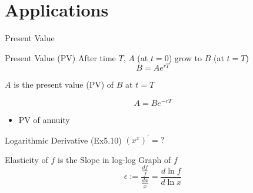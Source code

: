 \documentclass[final]{beamer}
\begin{document}
\section{Applications} %
\label{sec:applications}
\begin{frame}[t]{Present Value}
	\begin{block}{Present Value (PV)}
		After time $T$, $A$ (at $t=0$) grow to $B$ (at $t=T$)
		\[
			B = Ae^{rT}
		\]
	
		$A$ is the present value (PV) of $B$ at $t=T$
	
		\[
			A = Be^{-rT}
		\]
	\end{block}
	
	\begin{itemize}
		\item PV of annuity
	\end{itemize}
\end{frame}

\begin{frame}[t]{Logarithmic Derivative}
	(Ex5.10) $(x^x)^\prime = ?$
	
	\begin{block}
		{Elasticity of $f$ is the Slope in log-log Graph of $f$}
		\[
			\epsilon := \frac{\frac{df}{f}}{\frac{dx}{x}} = \frac{d\ln f }{d\ln x}
		\]
	\end{block}
	
\end{frame}
	
\end{document}

